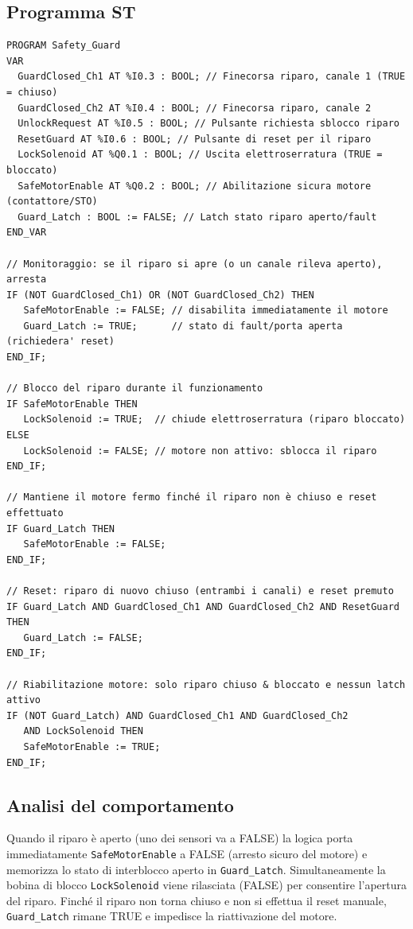 \subsection{Programma ST}
\begin{lstlisting}[basicstyle=\ttfamily\small]
PROGRAM Safety_Guard
VAR
  GuardClosed_Ch1 AT %I0.3 : BOOL; // Finecorsa riparo, canale 1 (TRUE = chiuso)
  GuardClosed_Ch2 AT %I0.4 : BOOL; // Finecorsa riparo, canale 2
  UnlockRequest AT %I0.5 : BOOL; // Pulsante richiesta sblocco riparo
  ResetGuard AT %I0.6 : BOOL; // Pulsante di reset per il riparo
  LockSolenoid AT %Q0.1 : BOOL; // Uscita elettroserratura (TRUE = bloccato)
  SafeMotorEnable AT %Q0.2 : BOOL; // Abilitazione sicura motore (contattore/STO)
  Guard_Latch : BOOL := FALSE; // Latch stato riparo aperto/fault
END_VAR

// Monitoraggio: se il riparo si apre (o un canale rileva aperto), arresta
IF (NOT GuardClosed_Ch1) OR (NOT GuardClosed_Ch2) THEN
   SafeMotorEnable := FALSE; // disabilita immediatamente il motore
   Guard_Latch := TRUE;      // stato di fault/porta aperta (richiedera' reset)
END_IF;

// Blocco del riparo durante il funzionamento
IF SafeMotorEnable THEN
   LockSolenoid := TRUE;  // chiude elettroserratura (riparo bloccato)
ELSE
   LockSolenoid := FALSE; // motore non attivo: sblocca il riparo
END_IF;

// Mantiene il motore fermo finché il riparo non è chiuso e reset effettuato
IF Guard_Latch THEN
   SafeMotorEnable := FALSE;
END_IF;

// Reset: riparo di nuovo chiuso (entrambi i canali) e reset premuto
IF Guard_Latch AND GuardClosed_Ch1 AND GuardClosed_Ch2 AND ResetGuard THEN
   Guard_Latch := FALSE;
END_IF;

// Riabilitazione motore: solo riparo chiuso & bloccato e nessun latch attivo
IF (NOT Guard_Latch) AND GuardClosed_Ch1 AND GuardClosed_Ch2
   AND LockSolenoid THEN
   SafeMotorEnable := TRUE;
END_IF;
\end{lstlisting}

\subsection{Analisi del comportamento}
Quando il riparo è aperto (uno dei sensori va a FALSE) la logica porta immediatamente \texttt{SafeMotorEnable} a FALSE (arresto sicuro del motore) e memorizza lo stato di interblocco aperto in \texttt{Guard\_Latch}. Simultaneamente la bobina di blocco \texttt{LockSolenoid} viene rilasciata (FALSE) per consentire l'apertura del riparo. Finché il riparo non torna chiuso e non si effettua il reset manuale, \texttt{Guard\_Latch} rimane TRUE e impedisce la riattivazione del motore.


